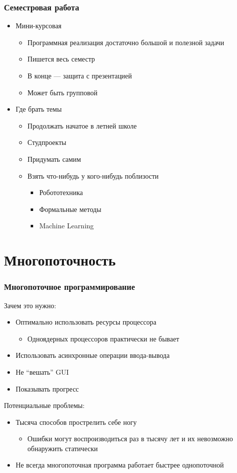 \documentclass[xetex,mathserif,serif]{beamer}
\begin{document}
	\begin{frame}
		\frametitle{Семестровая работа}
		\begin{itemize}
			\item Мини-курсовая
			\begin{itemize}
				\item Программная реализация достаточно большой и полезной задачи
				\item Пишется весь семестр
				\item В конце --- защита с презентацией
				\item Может быть групповой
			\end{itemize}
			\item Где брать темы
			\begin{itemize}
				\item Продолжать начатое в летней школе
				\item Студпроекты
				\item Придумать самим
				\item Взять что-нибудь у кого-нибудь поблизости
				\begin{itemize}
					\item Робототехника
					\item Формальные методы
					\item Machine Learning
				\end{itemize}
			\end{itemize}
		\end{itemize}
	\end{frame}

	\section{Многопоточность}

	\begin{frame}
		\frametitle{Многопоточное программирование}
		Зачем это нужно:
		\begin{itemize}
			\item Оптимально использовать ресурсы процессора
			\begin{itemize}
				\item Одноядерных процессоров практически не бывает
			\end{itemize}
			\item Использовать асинхронные операции ввода-вывода
			\item Не ``вешать'' GUI
			\item Показывать прогресс
		\end{itemize}
		\vspace{5mm}
		Потенциальные проблемы:
		\begin{itemize}
			\item Тысяча способов прострелить себе ногу
			\begin{itemize}
				\item Ошибки могут воспроизводиться раз в тысячу лет и их невозможно обнаружить статически
			\end{itemize}
			\item Не всегда многопоточная программа работает быстрее однопоточной
		\end{itemize}
	\end{frame}
\end{document}
